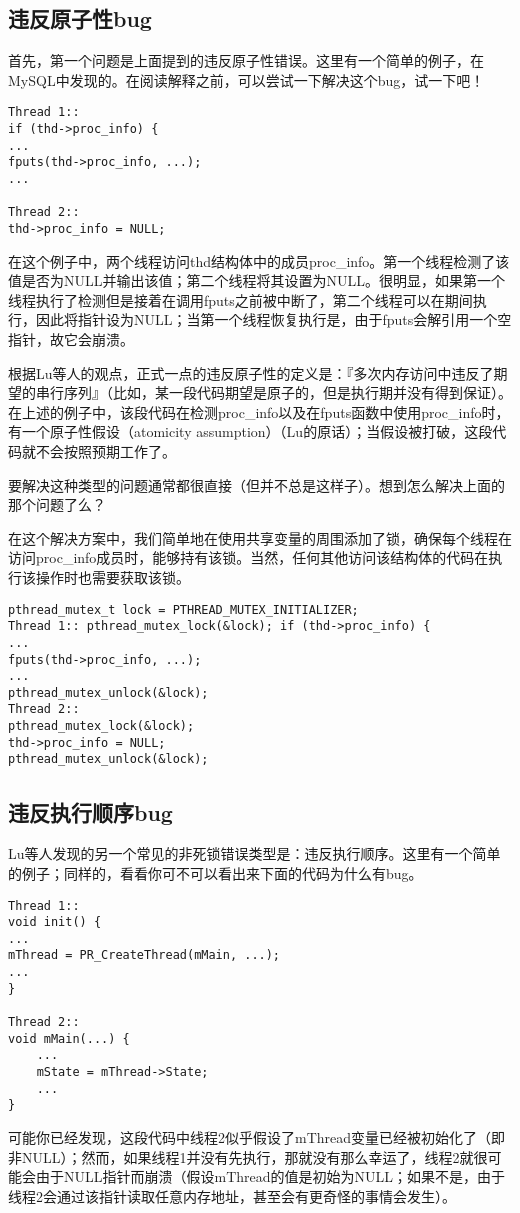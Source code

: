\subsection{违反原子性bug}
首先，第一个问题是上面提到的违反原子性错误。这里有一个简单的例子，在MySQL中发现的。在阅读解释之前，可以尝试一下解决这个bug，试一下吧！
\begin{verbatim}
Thread 1::
if (thd->proc_info) {
...
fputs(thd->proc_info, ...); 
...

Thread 2::
thd->proc_info = NULL;
\end{verbatim}

在这个例子中，两个线程访问thd结构体中的成员proc\_info。第一个线程检测了该值是否为NULL并输出该值；第二个线程将其设置为NULL。很明显，如果第一个线程执行了检测但是接着在调用fputs之前被中断了，第二个线程可以在期间执行，因此将指针设为NULL；当第一个线程恢复执行是，由于fputs会解引用一个空指针，故它会崩溃。

根据Lu等人的观点，正式一点的违反原子性的定义是：『多次内存访问中违反了期望的串行序列』（比如，某一段代码期望是原子的，但是执行期并没有得到保证）。在上述的例子中，该段代码在检测proc\_info以及在fputs函数中使用proc\_info时，有一个原子性假设（atomicity assumption）（Lu的原话）；当假设被打破，这段代码就不会按照预期工作了。

要解决这种类型的问题通常都很直接（但并不总是这样子）。想到怎么解决上面的那个问题了么？

在这个解决方案中，我们简单地在使用共享变量的周围添加了锁，确保每个线程在访问proc\_info成员时，能够持有该锁。当然，任何其他访问该结构体的代码在执行该操作时也需要获取该锁。

\begin{verbatim}
pthread_mutex_t lock = PTHREAD_MUTEX_INITIALIZER;
Thread 1:: pthread_mutex_lock(&lock); if (thd->proc_info) {
...
fputs(thd->proc_info, ...); 
...
pthread_mutex_unlock(&lock);
Thread 2::
pthread_mutex_lock(&lock);
thd->proc_info = NULL;
pthread_mutex_unlock(&lock);
\end{verbatim}

\subsection{违反执行顺序bug}
Lu等人发现的另一个常见的非死锁错误类型是：违反执行顺序。这里有一个简单的例子；同样的，看看你可不可以看出来下面的代码为什么有bug。
\begin{verbatim}
Thread 1::
void init() {
...
mThread = PR_CreateThread(mMain, ...); 
...
}

Thread 2::
void mMain(...) {
    ...
    mState = mThread->State;
    ...
}
\end{verbatim}
可能你已经发现，这段代码中线程2似乎假设了mThread变量已经被初始化了（即非NULL）；然而，如果线程1并没有先执行，那就没有那么幸运了，线程2就很可能会由于NULL指针而崩溃（假设mThread的值是初始为NULL；如果不是，由于线程2会通过该指针读取任意内存地址，甚至会有更奇怪的事情会发生）。

